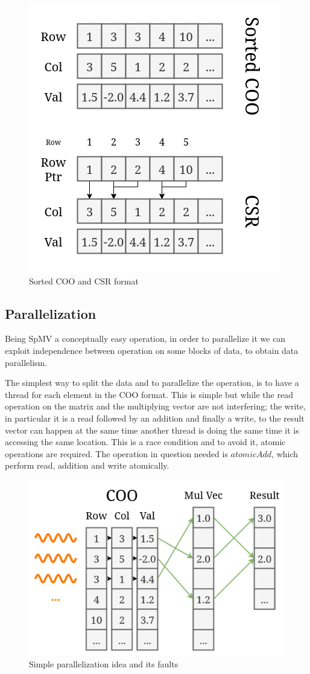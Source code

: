 \documentclass[conference]{IEEEtran}
\begin{document}
\begin{figure}[h!]
	\centering
	\includegraphics[width=0.7\linewidth]{other_img/diagram-csr-sorted-coo}
	\caption{Sorted COO and CSR format}
	\label{fig:diagram-csr-sorted-coo}
\end{figure}


\subsection{Parallelization}
Being SpMV a conceptually easy operation, in order to parallelize it we can exploit independence between operation on some blocks of data, to obtain data parallelism.

The simplest way to split the data and to parallelize the operation, is to have a thread for each element in the COO format. This is simple but while the read operation on the matrix and the multiplying vector are not interfering; the write, in particular it is a read followed by an addition and finally a write, to the result vector can happen at the same time another thread is doing the same time it is accessing the same location. This is a race condition and to avoid it, atomic operations are required. The operation in question needed is $atomicAdd$, which perform read, addition and write atomically.

\begin{figure}[h!]
	\centering
	\includegraphics[width=0.7\linewidth]{other_img/diagram-threads}
	\caption{Simple parallelization idea and its faults}
	\label{fig:diagram-threads}
\end{figure}
\end{document}
